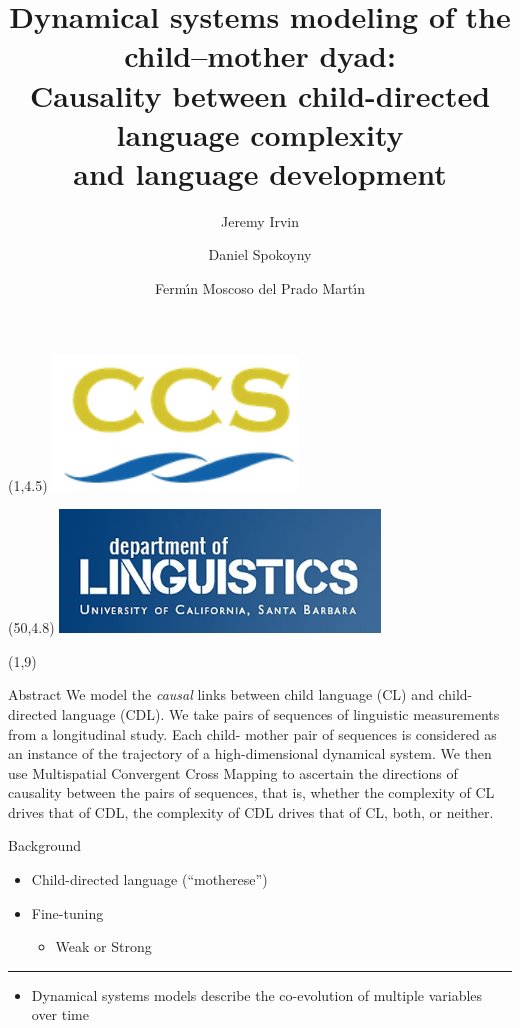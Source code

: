 \documentclass[final]{beamer}
\title{Dynamical systems modeling of the child–mother dyad:\\ \vspace{0.15em}
Causality between child-directed language complexity \\ 
\vspace{0.15em}
and language development \vspace{0.15em}}
\author[shortname]{Jeremy Irvin 
\and Daniel Spokoyny 
\and Ferm\'{\i}n Moscoso del Prado Mart\'{\i}n 
}
\date{}
\begin{document}
\begin{frame}{} 

\begin{textblock}{10}(1,4.5)
\includegraphics[width=6.5cm]{ccs.png}
\end{textblock}

\begin{textblock}{10}(50,4.8)
\includegraphics[width=8.5cm]{ling.jpg}
\end{textblock}

\begin{textblock}{28}(1,9)
\begin{block}{Abstract}
We model the \emph{causal} links between child language (CL) and child-directed language (CDL). We take pairs of sequences of linguistic measurements from a longitudinal study. Each child- mother pair of sequences is considered as an instance of the trajectory of a high-dimensional dynamical system. We then use Multispatial Convergent Cross Mapping to ascertain the directions of causality between the pairs of sequences, that is, whether the complexity of CL drives that of CDL, the complexity of CDL drives that of CL, both, or neither.
\end{block}

\begin{block}{Background}

\begin{itemize}
\item \text{ }Child-directed language (``motherese'')
\item \text{ }Fine-tuning 
\begin{itemize}
\item \text{ }Weak or Strong
\end{itemize}
\end{itemize}
\hrule
\begin{itemize}
\item \text{ }Dynamical systems models describe the co-evolution of multiple variables over time


\end{itemize}
\end{block}
\end{textblock}
\end{frame}
\end{document}
